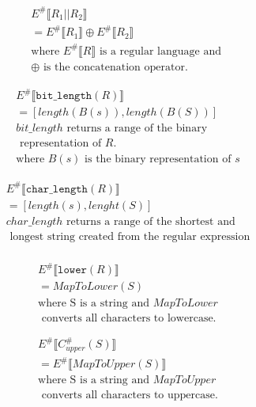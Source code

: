 \begin{align*}
    E^\# \llbracket R_1 \texttt{||} R_2 \rrbracket \\
    = E^\# \llbracket R_1 \rrbracket \oplus  E^\# \llbracket R_2 \rrbracket \\
    \text{where } E^\# \llbracket R \rrbracket \text{ is a regular language and }\\
     \oplus \text{ is the concatenation operator.}
\end{align*}

\begin{align*}
    E^\# \llbracket \texttt{bit\_length} (R) \rrbracket \\
    =  [length(B(s)), length(B(S))] \\
    bit\_length \text{ returns a range of the binary} \\
    \text{ representation of } R. \\
    \text{where } B(s) \text{ is the binary representation of }s
\end{align*}

\begin{align*}
    E^\# \llbracket \texttt{char\_length} (R) \rrbracket \\
    =  [length(s), lenght(S)] \\
    char\_length \text{ returns a range of the shortest and} \\
    \text{ longest string created from the regular expression} \\
\end{align*}

\begin{align*}
    E^\# \llbracket \texttt{lower} (R) \rrbracket \\
    =  MapToLower (S) \\
    \text{where S is a string and } MapToLower \\
    \text{ converts all characters to lowercase.}
\end{align*}

\begin{align*}
    E^\# \llbracket C_{upper}^\# (S) \rrbracket \\
    = E^\# \llbracket MapToUpper (S) \rrbracket \\
    \text{where S is a string and } MapToUpper \\
    \text{ converts all characters to uppercase.}
\end{align*}

